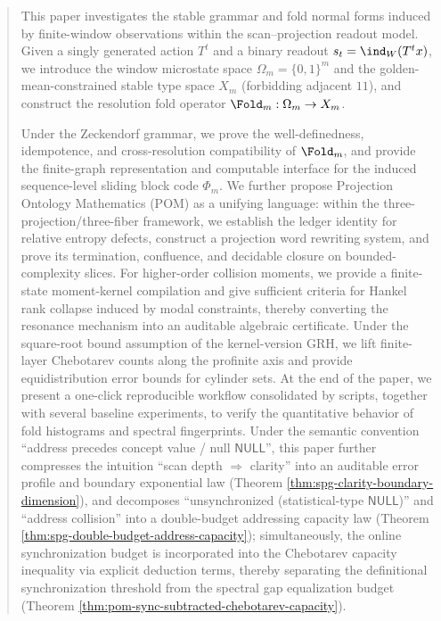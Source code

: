 \begin{abstract}
This paper investigates the stable grammar and fold normal forms induced by finite-window observations within the scan--projection readout model. Given a singly generated action \(T^t\) and a binary readout \(s_t=\ind_W(T^t x)\), we introduce the window microstate space \(\Omega_m=\{0,1\}^m\) and the golden-mean-constrained stable type space \(X_m\) (forbidding adjacent \(11\)), and construct the resolution fold operator \(\Fold_m:\Omega_m\to X_m\).

Under the Zeckendorf grammar, we prove the well-definedness, idempotence, and cross-resolution compatibility of \(\Fold_m\), and provide the finite-graph representation and computable interface for the induced sequence-level sliding block code \(\Phi_m\). We further propose Projection Ontology Mathematics (POM) as a unifying language: within the three-projection/three-fiber framework, we establish the ledger identity for relative entropy defects, construct a projection word rewriting system, and prove its termination, confluence, and decidable closure on bounded-complexity slices. For higher-order collision moments, we provide a finite-state moment-kernel compilation and give sufficient criteria for Hankel rank collapse induced by modal constraints, thereby converting the resonance mechanism into an auditable algebraic certificate. Under the square-root bound assumption of the kernel-version GRH, we lift finite-layer Chebotarev counts along the profinite axis and provide equidistribution error bounds for cylinder sets. At the end of the paper, we present a one-click reproducible workflow consolidated by scripts, together with several baseline experiments, to verify the quantitative behavior of fold histograms and spectral fingerprints.
Under the semantic convention ``address precedes concept value / null \(\mathsf{NULL}\)'', this paper further compresses the intuition ``scan depth \(\Rightarrow\) clarity'' into an auditable error profile and boundary exponential law (Theorem \ref{thm:spg-clarity-boundary-dimension}), and decomposes ``unsynchronized (statistical-type \(\mathsf{NULL}\))'' and ``address collision'' into a double-budget addressing capacity law (Theorem \ref{thm:spg-double-budget-address-capacity}); simultaneously, the online synchronization budget is incorporated into the Chebotarev capacity inequality via explicit deduction terms, thereby separating the definitional synchronization threshold from the spectral gap equalization budget (Theorem \ref{thm:pom-sync-subtracted-chebotarev-capacity}).


\end{abstract}
